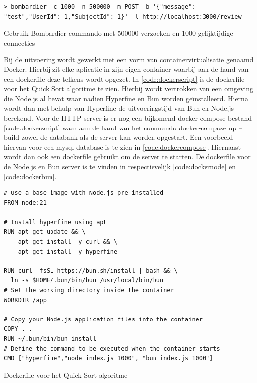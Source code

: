 \begin{listing}[H]
  \centering
  \begin{verbatim}
> bombardier -c 1000 -n 500000 -m POST -b '{"message": "test","UserId": 1,"SubjectId": 1}' -l http://localhost:3000/review
      \end{verbatim}
      \caption{\label{code:Bombardier1000}Gebruik Bombardier commando met 500000 verzoeken en 1000 gelijktijdige connecties}
\end{listing}
Bij de uitvoering wordt gewerkt met een vorm van containervirtualisatie genaamd Docker.
Hierbij zit elke aplicatie in zijn eigen container waarbij aan de hand van een dockerfile deze telkens wordt opgezet.
In \ref{code:dockerscript} is de dockerfile voor het Quick Sort algoritme te zien. 
Hierbij wordt vertrokken van een omgeving die Node.js al bevat waar nadien Hyperfine en Bun worden geïnstalleerd.
Hierna wordt dan met behulp van Hyperfine de uitvoeringstijd van Bun en Node.js berekend.
Voor de HTTP server is er nog een bijkomend
docker-compose bestand \ref{code:dockerscript} waar aan de hand van het commando docker-compose up --build
zowel de databank als de server kan worden opgestart. Een voorbeeld hiervan voor een mysql database is te zien in \ref{code:dockercompose}.
Hiernaast wordt dan ook een dockerfile gebruikt om de server te starten. De dockerfile voor de Node.js en Bun server is te vinden in
 respectievelijk \ref{code:dockernode} en \ref{code:dockerbun}.
\begin{listing}[H]
  \centering
  \begin{verbatim}
# Use a base image with Node.js pre-installed
FROM node:21

# Install hyperfine using apt
RUN apt-get update && \
    apt-get install -y curl && \
    apt-get install -y hyperfine

RUN curl -fsSL https://bun.sh/install | bash && \
  ln -s $HOME/.bun/bin/bun /usr/local/bin/bun
# Set the working directory inside the container
WORKDIR /app

# Copy your Node.js application files into the container
COPY . .
RUN ~/.bun/bin/bun install
# Define the command to be executed when the container starts
CMD ["hyperfine","node index.js 1000", "bun index.js 1000"]
      \end{verbatim}
      \caption{\label{code:dockerscript}Dockerfile voor het Quick Sort algoritme}
\end{listing}

